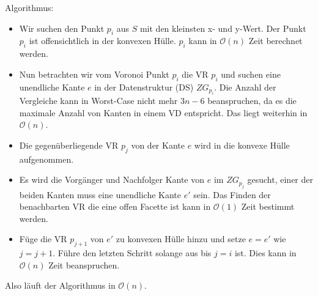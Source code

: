 \documentclass[a4paper]{article}
\begin{document}
Algorithmus:

\begin{itemize}

\item Wir suchen den Punkt $p_i$ aus $S$ mit den kleinsten x- und y-Wert. Der Punkt $p_i$ ist offensichtlich in der konvexen Hülle. $p_i$ kann in $\mathcal{O}(n)$ Zeit berechnet werden.

\item Nun betrachten wir vom Voronoi Punkt $p_i$ die VR $p_i$ und suchen eine unendliche Kante $e$ in der Datenstruktur (DS) $ZG_{p_i}$. Die Anzahl der Vergleiche kann in Worst-Case nicht mehr $3 n-6$ beanspruchen, da es die maximale Anzahl von Kanten in einem VD entspricht. Das liegt weiterhin in $\mathcal{O}(n)$.

\item Die gegenüberliegende VR $p_j$ von der Kante $e$ wird in die konvexe Hülle aufgenommen.

\item Es wird die Vorgänger und Nachfolger Kante von $e$ im $ZG_{p_j}$ gesucht, einer der beiden Kanten muss eine unendliche Kante $e'$ sein. Das Finden der benachbarten VR die eine offen Facette ist kann in $\mathcal{O}(1)$ Zeit bestimmt werden. 

\item Füge die VR $p_{j+1}$ von $e'$ zu konvexen Hülle hinzu und setze $e = e'$ wie $j=j+1$. Führe den letzten Schritt solange aus bis $j=i$ ist. Dies kann in $\mathcal{O}(n)$ Zeit beanspruchen.

\end{itemize}

Also läuft der Algorithmus in $\mathcal{O}(n)$.
\end{document}
